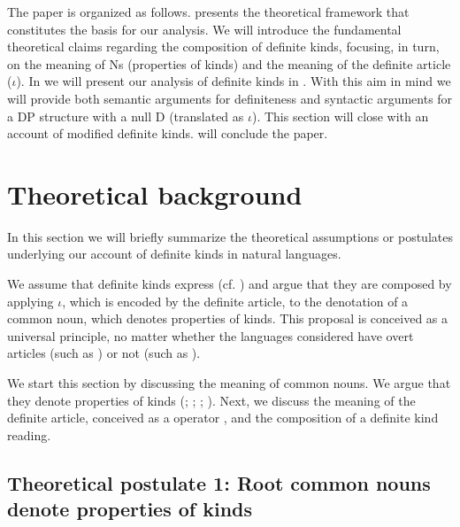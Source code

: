 \documentclass[output=paper
,modfonts
,nonflat]{langsci/langscibook}
\begin{document}
	The paper is organized as follows.   presents the theoretical framework that constitutes the basis for our analysis. We will introduce the fundamental theoretical claims regarding the composition of definite kinds, focusing, in turn, on the meaning of Ns (properties of kinds) and the meaning of the definite article ($\iota$). In  we will present our analysis of definite kinds in . With this aim in mind we will provide both semantic arguments for definiteness and syntactic arguments for a DP structure with a null D (translated as $\iota$). This section will close with an account of modified definite kinds.  will conclude the paper. 
	
	\section{Theoretical background} \label{sec:borik:2}
	
	In this section we will briefly summarize the theoretical assumptions or postulates underlying our account of definite kinds in natural languages.
	
	We assume that definite kinds express  (cf. \citealt{KrifkaEtAlii1995}) and argue that they are composed by applying $\iota$, which is encoded by the definite article, to the denotation of a common noun, which denotes properties of kinds. This proposal is conceived as a universal principle, no matter whether the languages considered have overt articles (such as ) or not (such as ). 
	
	We start this section by discussing the meaning of common nouns. We argue that they denote properties of kinds (\citealt{Espinal2007,Espinal2007a}; \citealt{Dobrovie-Sorin2008}; \citealt{Espinal2010}; \citealt{Espinal2011}). Next, we discuss the meaning of the definite article, conceived as a  operator \citep{Sharvy1980}, and the composition of a definite kind reading. 
	
	\subsection{Theoretical postulate 1: Root common nouns denote properties of kinds}
	
\end{document}
